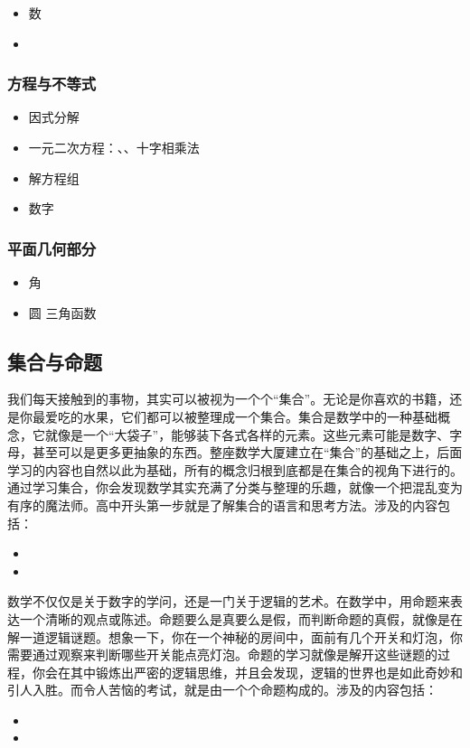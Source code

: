 \begin{itemize}
\item 数
\item {}
\end{itemize}


\subsubsection{方程与不等式}

\begin{itemize}
\item 因式分解
\item 一元二次方程：、、十字相乘法
\item 解方程组
\item 数字
\end{itemize}

\subsubsection{平面几何部分}

\begin{itemize}
\item 角
\item 圆
三角函数
\end{itemize}

\subsection{集合与命题}

我们每天接触到的事物，其实可以被视为一个个“集合”。无论是你喜欢的书籍，还是你最爱吃的水果，它们都可以被整理成一个集合。集合是数学中的一种基础概念，它就像是一个“大袋子”，能够装下各式各样的元素。这些元素可能是数字、字母，甚至可以是更多更抽象的东西。整座数学大厦建立在“集合”的基础之上，后面学习的内容也自然以此为基础，所有的概念归根到底都是在集合的视角下进行的。通过学习集合，你会发现数学其实充满了分类与整理的乐趣，就像一个把混乱变为有序的魔法师。高中开头第一步就是了解集合的语言和思考方法。涉及的内容包括：
\begin{itemize}
\item {}
\item {}
\end{itemize}

数学不仅仅是关于数字的学问，还是一门关于逻辑的艺术。在数学中，用命题来表达一个清晰的观点或陈述。命题要么是真要么是假，而判断命题的真假，就像是在解一道逻辑谜题。想象一下，你在一个神秘的房间中，面前有几个开关和灯泡，你需要通过观察来判断哪些开关能点亮灯泡。命题的学习就像是解开这些谜题的过程，你会在其中锻炼出严密的逻辑思维，并且会发现，逻辑的世界也是如此奇妙和引人入胜。而令人苦恼的考试，就是由一个个命题构成的。涉及的内容包括：
\begin{itemize}
\item {}
\item {}
\end{itemize}

